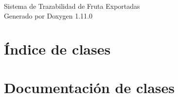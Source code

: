 \documentclass[twoside]{book}
\newcommand{\+}{\discretionary{\mbox{\scriptsize$\hookleftarrow$}}{}{}}
\newcommand{\clearemptydoublepage}{%
    \newpage{\pagestyle{empty}\cleardoublepage}%
  }
\begin{document}
  \raggedbottom
    \hypersetup{pageanchor=false,
                bookmarksnumbered=true,
                pdfencoding=unicode
               }
  \begin{titlepage}
  \vspace*{7cm}
  \begin{center}%
  {\Large Sistema de Trazabilidad de Fruta Exportadas}\\
  \vspace*{1cm}
  {\large Generado por Doxygen 1.11.0}\\
  \end{center}
  \end{titlepage}
  \clearemptydoublepage
  \tableofcontents
  \clearemptydoublepage
  \hypersetup{pageanchor=true}
\chapter{Índice de clases}

\chapter{Documentación de clases}

  \backmatter
  \newpage
  \clearemptydoublepage
  \printindex
\end{document}
